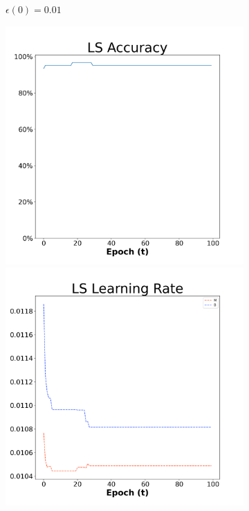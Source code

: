 \begin{figure}[H]
\begin{subfigure}{0.3\textwidth}
  \caption{$\epsilon(0)=0.01$}
\end{subfigure}\hfil %
\begin{subfigure}{0.3\textwidth}
  \includegraphics[width=\linewidth]{images/exper1/breast/LS_0.03_acc.png}
  \includegraphics[width=\linewidth]{images/exper1/breast/LS_0.03_lr.png}

\end{subfigure}
\end{figure}
